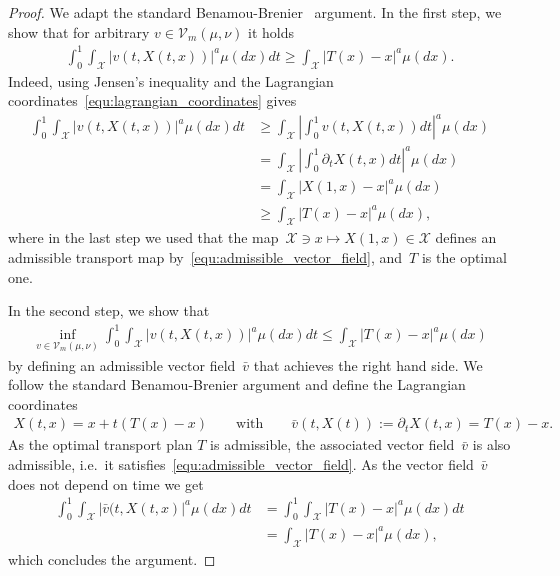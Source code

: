 \documentclass{article}
\theoremstyle{definition}
\begin{document}
\begin{proof}
    We adapt the standard Benamou-Brenier~\cite{benamou2000computational} argument. In the first step, we show that for arbitrary $v \in \mathcal{V}_m(\mu, \nu)$ it holds
    \begin{align}\label{equ:dynamic_lerger_static}
        \int_{0}^1 \int_{\mathcal{X}} |v(t, X(t,x))|^a \mu(dx) dt \geq \int_{\mathcal{X}} |T(x) -x|^a\mu(dx). 
    \end{align}
    Indeed, using Jensen's inequality and the Lagrangian coordinates~\eqref{equ:lagrangian_coordinates} gives
    \begin{align*}
        \int_{0}^1 \int_{\mathcal{X}} |v(t, X(t,x))|^a \mu(dx) dt & \geq \int_{\mathcal{X}} \left| \int_{0}^1 v(t, X(t,x)) dt \right|^a \mu(dx)  \\
        & = \int_{\mathcal{X}} \left| \int_{0}^1  \partial_t X(t, x ) dt  \right|^a \mu(dx) \\
        & = \int_{\mathcal{X}} \left| X(1,x) - x   \right|^a \mu(dx) \\
        & \geq \int_{\mathcal{X}} \left| T(x) - x   \right|^a \mu(dx),
    \end{align*}
    where in the last step we used that the map~$\mathcal{X} \ni x \mapsto X(1,x) \in \mathcal{X}$ defines an admissible transport map by~\eqref{equ:admissible_vector_field}, and~$T$ is the optimal one. \smallskip

    In the second step, we show that 
    \begin{align*}
       \inf_{v \in \mathcal{V}_m(\mu, \nu)} \int_{0}^1 \int_{\mathcal{X}} |v(t, X(t,x))|^a \mu(dx) dt \leq \int_{\mathcal{X}} \left| T(x) - x   \right|^a \mu(dx)
    \end{align*}
    by defining an admissible vector field~$\bar v$ that achieves the right hand side. We follow the standard Benamou-Brenier argument and define the Lagrangian coordinates
    \begin{align*}
        X(t,x) = x + t (T(x) -x)  \qquad \mbox{with} \qquad  \bar v(t,X(t)) := \partial_t X(t,x) = T(x)-x.
    \end{align*}
    As the optimal transport plan $T$ is admissible, the associated vector field~$\bar v$ is also admissible, i.e.~it satisfies~\eqref{equ:admissible_vector_field}. As the vector field~$\bar v$ does not depend on time we get 
    \begin{align*}
         \int_{0}^1 \int_{\mathcal{X}} |\bar v(t, X(t, x)|^a \mu(dx) dt & =  \int_{0}^1 \int_{\mathcal{X}} |T(x)-x|^a \mu(dx) dt \\
            & = \int_{\mathcal{X}} |T(x)-x|^a \mu(dx),
    \end{align*}
    which concludes the argument.
\end{proof}
\end{document}
